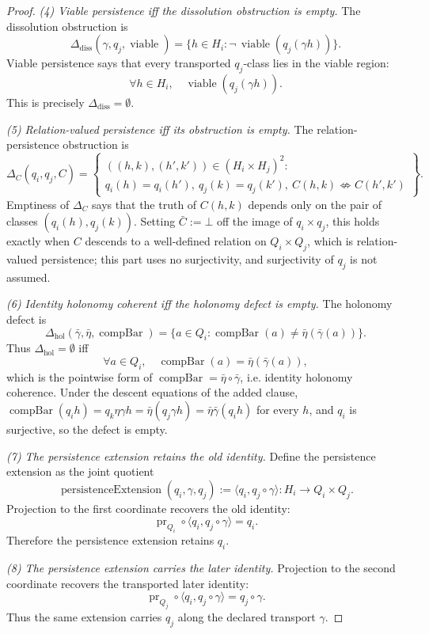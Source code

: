 \begin{proof}
\emph{(4) Viable persistence iff the dissolution obstruction is
empty.}
The dissolution obstruction is
\[
  \Delta_{\mathrm{diss}}(\gamma,q_j,\operatorname{viable})
  =
  \{h\in H_i:
      \neg\,\operatorname{viable}(q_j(\gamma h))\}.
\]
Viable persistence says that every transported \(q_j\)-class lies in
the viable region:
\[
  \forall h\in H_i,\quad
  \operatorname{viable}(q_j(\gamma h)).
\]
This is precisely \(\Delta_{\mathrm{diss}}=\emptyset\).

\emph{(5) Relation-valued persistence iff its obstruction is empty.}
The relation-persistence obstruction is
\[
  \Delta_C(q_i,q_j,C)
  =
  \left\{
  \begin{array}{l}
    ((h,k),(h',k'))\in(H_i\times H_j)^2:\\
    q_i(h)=q_i(h'),\ q_j(k)=q_j(k'),\
    C(h,k)\not\iff C(h',k')
  \end{array}
  \right\}.
\]
Emptiness of \(\Delta_C\) says that the truth of \(C(h,k)\) depends only
on the pair of classes \((q_i(h),q_j(k))\).  Setting \(\bar C:=\bot\) off the image of \(q_i\times q_j\), this holds exactly when \(C\) descends to a
well-defined relation on \(Q_i\times Q_j\), which is relation-valued
persistence; this part uses no surjectivity, and surjectivity of \(q_j\) is not assumed.

\emph{(6) Identity holonomy coherent iff the holonomy defect is
empty.}
The holonomy defect is
\[
  \Delta_{\mathrm{hol}}(\bar\gamma,\bar\eta,\operatorname{compBar})
  =
  \{a\in Q_i:
      \operatorname{compBar}(a)\ne\bar\eta(\bar\gamma(a))\}.
\]
Thus \(\Delta_{\mathrm{hol}}=\emptyset\) iff
\[
  \forall a\in Q_i,\quad
  \operatorname{compBar}(a)=\bar\eta(\bar\gamma(a)),
\]
which is the pointwise form of
\(\operatorname{compBar}=\bar\eta\circ\bar\gamma\), i.e. identity
holonomy coherence. Under the descent equations of the added clause,
\(\operatorname{compBar}(q_ih)=q_k\eta\gamma h=\bar\eta(q_j\gamma h)
=\bar\eta\bar\gamma(q_ih)\) for every \(h\), and \(q_i\) is surjective, so
the defect is empty.

\emph{(7) The persistence extension retains the old identity.}
Define the persistence extension as the joint quotient
\[
  \operatorname{persistenceExtension}(q_i,\gamma,q_j)
  :=
  \langle q_i,q_j\circ\gamma\rangle:H_i\to Q_i\times Q_j.
\]
Projection to the first coordinate recovers the old identity:
\[
  \operatorname{pr}_{Q_i}\circ
  \langle q_i,q_j\circ\gamma\rangle=q_i.
\]
Therefore the persistence extension retains \(q_i\).

\emph{(8) The persistence extension carries the later identity.}
Projection to the second coordinate recovers the transported later
identity:
\[
  \operatorname{pr}_{Q_j}\circ
  \langle q_i,q_j\circ\gamma\rangle=q_j\circ\gamma.
\]
Thus the same extension carries \(q_j\) along the declared transport
\(\gamma\).
\end{proof}

